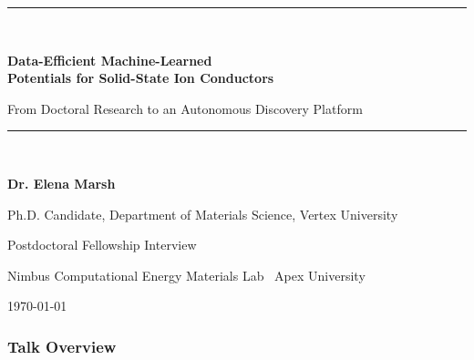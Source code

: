 \documentclass[aspectratio=169]{beamer}
\begin{document}
\begin{frame}[plain]
\vspace{0.25cm}
\begin{center}
{\color{accent}\rule{0.86\linewidth}{2pt}}\\[0.3cm]
{\color{white}\huge\bfseries Data-Efficient Machine-Learned\\[1pt] Potentials for Solid-State Ion Conductors\par}
\vspace{0.15cm}
{\color{white!85!black}\large From Doctoral Research to an Autonomous Discovery Platform\par}
\vspace{0.25cm}
{\color{accent}\rule{0.86\linewidth}{1pt}}\\[0.3cm]
{\color{white}\normalsize\bfseries Dr. Elena Marsh\par}
{\color{white!80!black}\small Ph.D. Candidate, Department of Materials Science, Vertex University\par}
\vspace{0.25cm}
{\color{white!85!black}\small Postdoctoral Fellowship Interview\par}
{\color{white!85!black}\small Nimbus Computational Energy Materials Lab \textbullet\ Apex University\par}
\vspace{0.2cm}
{\color{white!65!black}\footnotesize \today\par}
\end{center}
\end{frame}

\begin{frame}
\frametitle{Talk Overview}
\tableofcontents
\end{frame}








\end{document}
